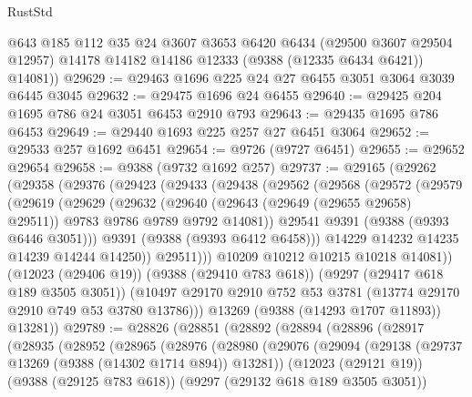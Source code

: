 \begin{lexlean}{RustStd}
\begin{coremodule}
        @643
        @185
        @112
        @35
        @24
        @3607
        @3653
        @6420
        @6434
        (@29500 @3607 @29504 @12957)
        @14178
        @14182
        @14186
        @12333
        (@9388 (@12335 @6434 @6421))
        @14081))
@29629 := @29463 @1696 @225 @24 @27 @6455 @3051 @3064 @3039 @6445 @3045
@29632 := @29475 @1696 @24 @6455
@29640 := @29425 @204 @1695 @786 @24 @3051 @6453 @2910 @793
@29643 := @29435 @1695 @786 @6453
@29649 := @29440 @1693 @225 @257 @27 @6451 @3064
@29652 := @29533 @257 @1692 @6451
@29654 := @9726 (@9727 @6451)
@29655 := @29652 @29654
@29658 := @9388 (@9732 @1692 @257)
@29737 := @29165
    (@29262
      (@29358
        (@29376
          (@29423
            (@29433
              (@29438
                (@29562
                  (@29568
                    (@29572
                      (@29579
                        (@29619
                          (@29629
                            (@29632
                              (@29640
                                (@29643 (@29649 (@29655 @29658) @29511))
                                @9783
                                @9786
                                @9789
                                @9792
                                @14081))
                            @29541
                            @9391
                            (@9388 (@9393 @6446 @3051)))
                          @9391
                          (@9388 (@9393 @6412 @6458)))
                        @14229
                        @14232
                        @14235
                        @14239
                        @14244
                        @14250))
                    @29511)))
              @10209
              @10212
              @10215
              @10218
              @14081))
          (@12023 (@29406 @19))
          (@9388 (@29410 @783 @618))
          (@9297 (@29417 @618 @189 @3505 @3051))
          (@10497 @29170 @2910 @752 @53 @3781 (@13774 @29170 @2910 @749 @53 @3780 @13786)))
        @13269
        (@9388 (@14293 @1707 @11893))
        @13281))
@29789 := @28826
    (@28851
      (@28892
        (@28894
          (@28896
            (@28917
              (@28935
                (@28952
                  (@28965
                    (@28976
                      (@28980
                        (@29076
                          (@29094
                            (@29138 (@29737 @13269 (@9388 (@14302 @1714 @894)) @13281))
                            (@12023 (@29121 @19))
                            (@9388 (@29125 @783 @618))
                            (@9297 (@29132 @618 @189 @3505 @3051))

\end{coremodule}
\end{lexlean}
